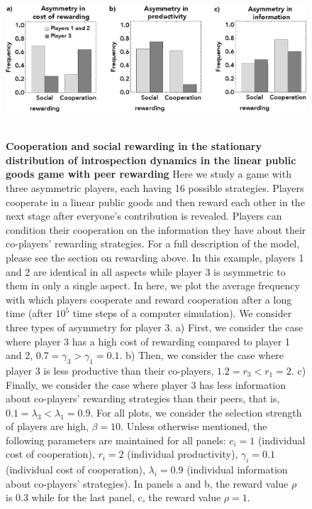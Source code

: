 \documentclass[11pt]{article}
\theoremstyle{plainCl1}
\theoremstyle{plainCl2}
\begin{document}
\clearpage
\begin{figure}
\centering
\includegraphics[width =  \textwidth]{figures/figure4.eps}~\\[0.4cm]
\caption{\onehalfspacing
\textbf{Cooperation and social rewarding in the stationary distribution of introspection dynamics in the linear public goods game with peer rewarding} Here we study a game with three asymmetric players, each having 16 possible strategies. Players cooperate in a linear public goods and then reward each other in the next stage after everyone's contribution is revealed. Players can condition their cooperation on the information they have about their co-players' rewarding strategies. For a full description of the model, please see the section on rewarding above. In this example, players 1 and 2 are identical in all aspects while player 3 is asymmetric to them in only a single aspect. In here, we plot the average frequency with which players cooperate and reward cooperation after a long time (after $10^5$ time steps of a computer simulation). We consider three types of asymmetry for player 3. a) First, we consider the case where player 3 has a high cost of rewarding compared to player 1 and 2, $0.7 = \gamma_3 > \gamma_1 = 0.1$. b) Then, we consider the case where player 3 is less productive than their co-players, $1.2 = r_3 < r_1 = 2$. c) Finally, we consider the case where player 3 has less information about co-players' rewarding strategies than their peers, that is, $0.1 = \lambda_3 < \lambda_1 = 0.9$. For all plots, we consider the selection strength of players are high, $\beta = 10$. Unless otherwise mentioned, the following parameters are maintained for all panels: $c_i = 1$ (individual cost of cooperation), $r_i = 2$ (individual productivity), $\gamma_i = 0.1$ (individual cost of cooperation), $\lambda_i = 0.9$ (individual information about co-players' strategies). In panels a and b, the reward value $\rho$ is 0.3 while for the last panel, c, the reward value $\rho = 1$.}
\label{Fig:SocialRewarding}
\end{figure}

\clearpage

\newpage

\end{document}

